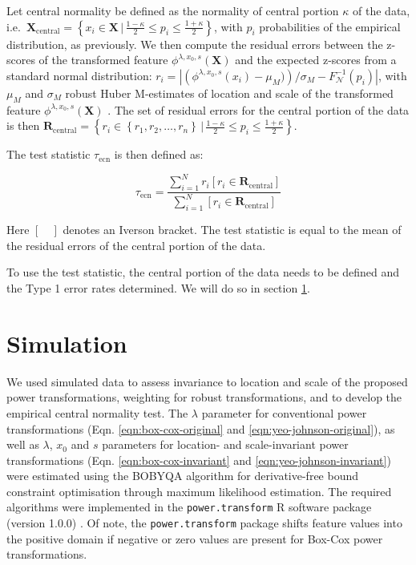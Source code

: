 \documentclass[preprint,12pt,authoryear]{elsarticle}
\begin{document}
Let central normality be defined as the normality of central portion
\(\kappa\) of the data,
i.e.~\(\mathbf{X}_{\text{central}} = \left\{x_i \in \mathbf{X} \, | \,  \frac{1-\kappa}{2} \leq  p_i \leq \frac{1 + \kappa}{2}\right\}\),
with \(p_i\) probabilities of the empirical distribution, as previously.
We then compute the residual errors between the z-scores of the
transformed feature \(\phi^{\lambda, x_0, s} (\mathbf{X})\) and the
expected z-scores from a standard normal distribution:
\(r_i =\left| \left( \phi^{\lambda, x_0, s}(x_i) - \mu_M)\right) / \sigma_M - F^{-1}_{\mathcal{N}}(p_i) \right|\),
with \(\mu_M\) and \(\sigma_M\) robust Huber M-estimates of location and
scale of the transformed feature \(\phi^{\lambda, x_0, s} (\mathbf{X})\)
\citep{Huber1981-su}. The set of residual errors for the central portion of the
data is then
\(\mathbf{R}_{\text{central}} = \left\{ r_i \in \left\{ r_1, r_2, \ldots, r_n\right\} \, | \,  \frac{1-\kappa}{2} \leq  p_i \leq \frac{1 + \kappa}{2}\right\}\).

The test statistic \(\tau_{\text{ecn}}\) is then defined as:

\begin{equation}
\tau_{\text{ecn}} = \frac{\sum_{i=1}^{N} r_i \left[r_i \in \mathbf{R}_{\text{central}}\right]}{\sum_{i=1}^N \left[r_i \in \mathbf{R}_{\text{central}}\right]} 
\end{equation}

Here \([\quad]\) denotes an Iverson bracket. The test statistic is equal
to the mean of the residual errors of the central portion of the data.

To use the test statistic, the central portion of the data needs to be
defined and the Type 1 error rates determined. We will do so in
section \ref{simulation}.

\section{Simulation}\label{simulation}

We used simulated data to assess invariance to location and scale of the
proposed power transformations, weighting for robust transformations,
and to develop the empirical central normality test. The \(\lambda\)
parameter for conventional power transformations (Eqn.
\ref{eqn:box-cox-original} and \ref{eqn:yeo-johnson-original}), as well
as \(\lambda\), \(x_0\) and \(s\) parameters for location- and
scale-invariant power transformations (Eqn. \ref{eqn:box-cox-invariant}
and \ref{eqn:yeo-johnson-invariant}) were estimated using the BOBYQA
algorithm for derivative-free bound constraint optimisation \citep{Powell2009-zb}
through maximum likelihood estimation. The required algorithms
were implemented in the \texttt{power.transform} R software package
(version 1.0.0) \citep{Zwanenburg2024-kq}. Of note, the
\texttt{power.transform} package shifts feature values into the positive
domain if negative or zero values are present for Box-Cox power
transformations.
\end{document}
